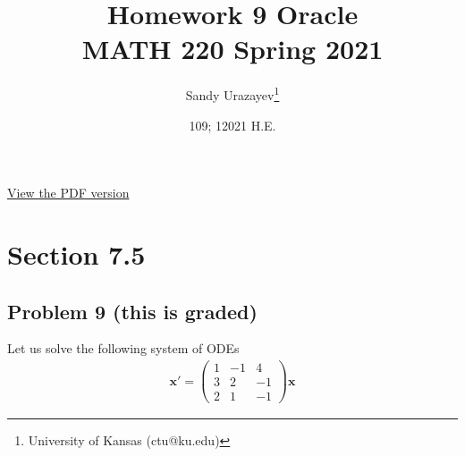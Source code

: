 \documentclass[12pt]{article}
\author{Sandy Urazayev\thanks{University of Kansas (ctu@ku.edu)}}
\date{109; 12021 H.E.}
\title{Homework 9 Oracle\\\medskip
\large MATH 220 Spring 2021}
\begin{document}
\maketitle
\href{./index.pdf}{View the PDF version​}

\section*{Section 7.5}
\label{sec:orgb5c7d7f}
\subsection*{Problem 9 (this is graded)}
\label{sec:orgf7adb56}
Let us solve the following system of ODEs
\begin{align*}
        \mathbf{x}' =
        \begin{pmatrix}
                1 & -1 & 4  \\
                3 & 2  & -1 \\
                2 & 1  & -1
        \end{pmatrix} \mathbf{x}
\end{align*}
\end{document}
